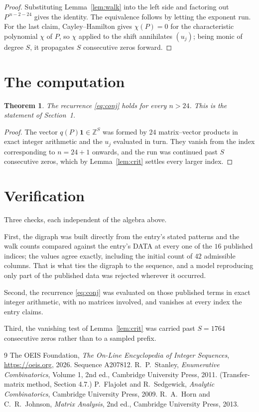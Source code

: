 \documentclass[11pt,a4paper]{article}
\theoremstyle{plain}
\newtheorem{theorem}{Theorem}
\theoremstyle{definition}
\begin{document}
\begin{proof}
Substituting Lemma~\ref{lem:walk} into the left side and factoring out
$P^{\,n-2-24}$ gives the identity. The equivalence follows by letting the exponent
run. For the last claim, Cayley--Hamilton gives $\chi(P)=0$ for the characteristic
polynomial $\chi$ of $P$, so $\chi$ applied to the shift annihilates $(u_j)$; being monic of
degree $S$, it propagates $S$ consecutive zeros forward.
\end{proof}

\section{The computation}

\begin{theorem}
The recurrence \eqref{eq:conj} holds for every $n>24$. This is the statement of
Section~1.
\end{theorem}

\begin{proof}
The vector $q(P)\mathbf{1}\in\mathbb{Z}^{S}$ was formed by $24$ matrix--vector
products in exact integer arithmetic and the $u_j$ evaluated in turn. They vanish from the
index corresponding to $n=24+1$ onwards, and the run was continued past $S$ consecutive
zeros, which by Lemma~\ref{lem:crit} settles every larger index.
\end{proof}

\section{Verification}

Three checks, each independent of the algebra above.

First, the digraph was built directly from the entry's stated patterns and the walk counts
compared against the entry's DATA at every one of the $16$ published indices; the
values agree exactly, including the initial count of $42$ admissible columns. That is
what ties the digraph to the sequence, and a model reproducing only part of the published
data was rejected wherever it occurred.

Second, the recurrence \eqref{eq:conj} was evaluated on those published terms in exact
integer arithmetic, with no matrices involved, and vanishes at every index the entry claims.

Third, the vanishing test of Lemma~\ref{lem:crit} was carried past $S=1764$ consecutive
zeros rather than to a sampled prefix.

\begin{thebibliography}{9}
 The OEIS Foundation, \emph{The On-Line Encyclopedia of Integer
Sequences}, \url{https://oeis.org}, 2026. Sequence A207812.
 R.~P.~Stanley, \emph{Enumerative Combinatorics}, Volume 1, 2nd ed.,
Cambridge University Press, 2011. (Transfer-matrix method, Section 4.7.)
 P.~Flajolet and R.~Sedgewick, \emph{Analytic Combinatorics}, Cambridge
University Press, 2009.
 R.~A.~Horn and C.~R.~Johnson, \emph{Matrix Analysis}, 2nd ed., Cambridge
University Press, 2013.
\end{thebibliography}
\end{document}
